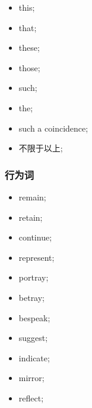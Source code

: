   \begin{multicols}{3}
    \begin{itemize}
      \item this;
      \item that;
      \item these;
      \item those;
      \item such;
      \item the;
      \item such a coincidence;
      \item 不限于以上;
    \end{itemize}
  \end{multicols}

\subsubsection{行为词}

  \begin{multicols}{3}
    \begin{itemize}
      \item remain;
      \item retain;
      \item continue;
      \item represent;
      \item portray;
      \item betray;
      \item bespeak;
      \item suggest;
      \item indicate;
      \item mirror;
      \item reflect;
    \end{itemize}
  \end{multicols}

